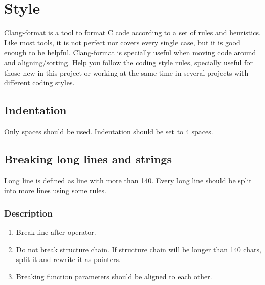 \section{Style}
Clang-format is a tool to format C code according to a set of rules and heuristics. Like most tools, it is not perfect nor covers every single case, but it is good enough to be helpful. Clang-format is specially useful when moving code around and aligning/sorting. Help you follow the coding style rules, specially useful for those new in this project or working at the same time in several projects with different coding styles.

\subsection{Indentation}
Only spaces should be used. Indentation should be set to 4 spaces.

\subsection{Breaking long lines and strings}
Long line is defined as line with more than 140. Every long line should be split into more lines using some rules.
\subsubsection{Description}
\begin{enumerate}
    \item Break line after operator.
    \item Do not break structure chain. If structure chain will be longer than 140 chars, split it and rewrite it as pointers.
    \item Breaking function parameters should be aligned to each other.
\end{enumerate}

